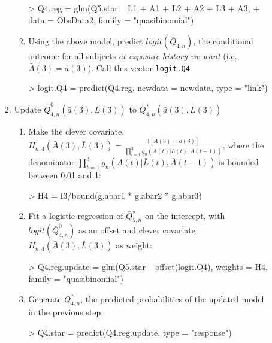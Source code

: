 \documentclass[answers]{exam}
\begin{document}
\begin{enumerate}
\begin{enumerate}
\begin{enumerate}
\begin{enumerate}
\begin{Schunk}
\begin{Sinput}
> Q4.reg = glm(Q5.star ~ L1 + A1 + L2 + A2 + L3 + A3, 
+              data = ObsData2, family = "quasibinomial")
\end{Sinput}
\end{Schunk}
\item Using the above model, predict $logit(\bar{Q}_{4,n})$, the conditional outcome for all subjects \textit{at exposure history we want} (i.e., $\bar{A}(3) = \bar{a}(3)$). Call this vector \texttt{logit.Q4}.
\begin{Schunk}
\begin{Sinput}
> logit.Q4 = predict(Q4.reg, newdata = newdata, type = "link")
\end{Sinput}
\end{Schunk}
\end{enumerate}
\item Update $\bar{Q}^0_{4,n}(\bar{a}(3), \bar{L}(3))$ to $\bar{Q}^\star_{4,n}(\bar{a}(3), \bar{L}(3))$
\begin{enumerate}
\item Make the clever covariate, $H_{n,4}(\bar{A}(3), \bar{L}(3)) = \frac{\mathbb{I}[\bar{A}(3) = \bar{a}(3)]}{\prod_{t=1}^3g_n(A(t)|\bar{L}(t), \bar{A}(t-1))}$, where the denominator $\prod_{t=1}^3g_n(A(t)|\bar{L}(t), \bar{A}(t-1))$ is bounded between 0.01 and 1:
\begin{Schunk}
\begin{Sinput}
> H4 = I3/bound(g.abar1 * g.abar2 * g.abar3)
\end{Sinput}
\end{Schunk}
\item Fit a logistic regression of $\bar{Q}^\star_{5,n}$ on the intercept, with $logit(\bar{Q}^0_{4,n})$ as an offset and clever covariate $H_{n,4}(\bar{A}(3), \bar{L}(3))$ as weight:
\begin{Schunk}
\begin{Sinput}
> Q4.reg.update = glm(Q5.star ~ offset(logit.Q4), weights = H4, family = "quasibinomial")
\end{Sinput}
\end{Schunk}
\item Generate $\bar{Q}^\star_{4,n}$, the predicted probabilities of the updated model in the previous step:
\begin{Schunk}
\begin{Sinput}
> Q4.star = predict(Q4.reg.update, type = "response")
\end{Sinput}
\end{Schunk}
\end{enumerate}

\end{enumerate}
\end{enumerate}
\end{enumerate}
\end{document}
